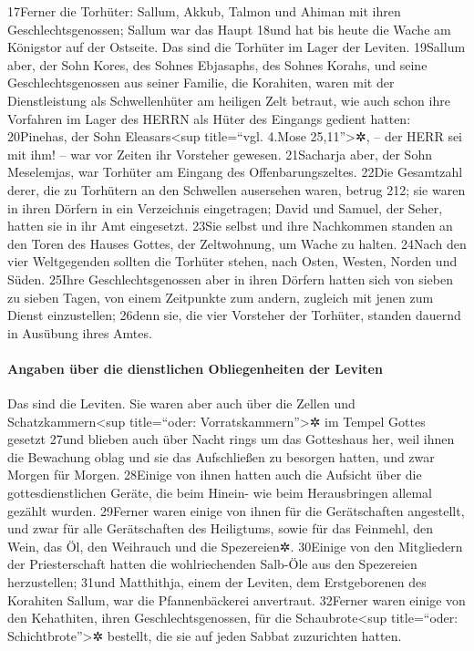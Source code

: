17Ferner die Torhüter: Sallum, Akkub, Talmon und Ahiman mit ihren
Geschlechtsgenossen; Sallum war das Haupt 18und hat bis heute die Wache
am Königstor auf der Ostseite. Das sind die Torhüter im Lager der
Leviten. 19Sallum aber, der Sohn Kores, des Sohnes Ebjasaphs, des Sohnes
Korahs, und seine Geschlechtsgenossen aus seiner Familie, die Korahiten,
waren mit der Dienstleistung als Schwellenhüter am heiligen Zelt
betraut, wie auch schon ihre Vorfahren im Lager des HERRN als Hüter des
Eingangs gedient hatten: 20Pinehas, der Sohn Eleasars\textless sup
title=``vgl. 4.Mose 25,11''\textgreater✲, -- der HERR sei mit ihm! --
war vor Zeiten ihr Vorsteher gewesen. 21Sacharja aber, der Sohn
Meselemjas, war Torhüter am Eingang des Offenbarungszeltes. 22Die
Gesamtzahl derer, die zu Torhütern an den Schwellen ausersehen waren,
betrug 212; sie waren in ihren Dörfern in ein Verzeichnis eingetragen;
David und Samuel, der Seher, hatten sie in ihr Amt eingesetzt. 23Sie
selbst und ihre Nachkommen standen an den Toren des Hauses Gottes, der
Zeltwohnung, um Wache zu halten. 24Nach den vier Weltgegenden sollten
die Torhüter stehen, nach Osten, Westen, Norden und Süden. 25Ihre
Geschlechtsgenossen aber in ihren Dörfern hatten sich von sieben zu
sieben Tagen, von einem Zeitpunkte zum andern, zugleich mit jenen zum
Dienst einzustellen; 26denn sie, die vier Vorsteher der Torhüter,
standen dauernd in Ausübung ihres Amtes.

\hypertarget{angaben-uxfcber-die-dienstlichen-obliegenheiten-der-leviten}{%
\paragraph{Angaben über die dienstlichen Obliegenheiten der
Leviten}\label{angaben-uxfcber-die-dienstlichen-obliegenheiten-der-leviten}}

Das sind die Leviten. Sie waren aber auch über die Zellen und
Schatzkammern\textless sup title=``oder: Vorratskammern''\textgreater✲
im Tempel Gottes gesetzt 27und blieben auch über Nacht rings um das
Gotteshaus her, weil ihnen die Bewachung oblag und sie das Aufschließen
zu besorgen hatten, und zwar Morgen für Morgen. 28Einige von ihnen
hatten auch die Aufsicht über die gottesdienstlichen Geräte, die beim
Hinein- wie beim Herausbringen allemal gezählt wurden. 29Ferner waren
einige von ihnen für die Gerätschaften angestellt, und zwar für alle
Gerätschaften des Heiligtums, sowie für das Feinmehl, den Wein, das Öl,
den Weihrauch und die Spezereien✲. 30Einige von den Mitgliedern der
Priesterschaft hatten die wohlriechenden Salb-Öle aus den Spezereien
herzustellen; 31und Matthithja, einem der Leviten, dem Erstgeborenen des
Korahiten Sallum, war die Pfannenbäckerei anvertraut. 32Ferner waren
einige von den Kehathiten, ihren Geschlechtsgenossen, für die
Schaubrote\textless sup title=``oder: Schichtbrote''\textgreater✲
bestellt, die sie auf jeden Sabbat zuzurichten hatten.

